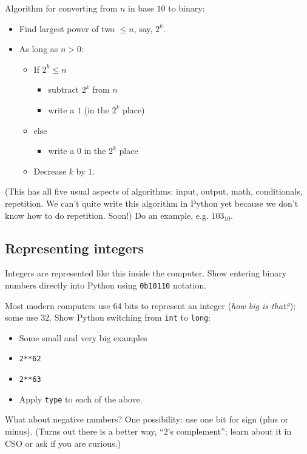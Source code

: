 \documentclass{article}
\begin{document}
Algorithm for converting from $n$ in base $10$ to binary:
\begin{itemize}
\item Find largest power of two $\leq n$, say, $2^k$.
\item As long as $n > 0$:
  \begin{itemize}
  \item If $2^k \leq n$
    \begin{itemize}
    \item subtract $2^k$ from $n$
    \item write a $1$ (in the $2^k$ place)
    \end{itemize}
  \item else
    \begin{itemize}
    \item  write a $0$ in the $2^k$ place
    \end{itemize}
  \item Decrease $k$ by $1$.
  \end{itemize}
\end{itemize}

(This has all five usual aspects of algorithms: input, output, math,
conditionals, repetition.  We can't quite write this algorithm in
Python yet because we don't know how to do repetition.  Soon!)  Do an
example, e.g. $103_{10}$.

\subsection*{Representing integers}

Integers are represented like this inside the computer.  Show entering
binary numbers directly into Python using \verb|0b10110| notation.

Most modern computers use $64$ bits to represent an integer (\emph{how
  big is that?}); some use $32$. Show Python switching from \verb|int|
to \verb|long|:
\begin{itemize}
\item Some small and very big examples
\item \verb|2**62|
\item \verb|2**63|
\item Apply \verb|type| to each of the above.
\end{itemize}

What about negative numbers?  One possibility: use one bit for sign
(plus or minus).  (Turns out there is a better way, ``$2$'s
complement''; learn about it in CSO or ask if you are curious.)
\end{document}
